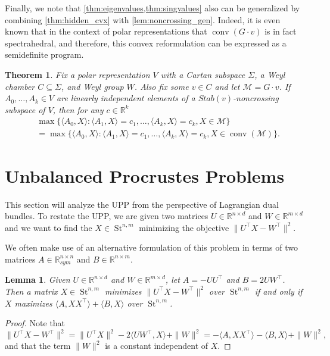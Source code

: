 \documentclass{article}
\numberwithin{equation}{section}
\newcommand{\R}{\mathbb{R}}
\DeclareMathOperator*{\conv}{conv}
\newtheorem{theorem}{Theorem}[section]
\newtheorem{lemma}{Lemma}[section]
\newcommand{\cM}{{\mathcal{M}}}
\DeclareMathOperator{\St}{St}
\begin{document}
Finally, we note that \cref{thm:eigenvalues,thm:singvalues} also can be generalized by combining \cref{thm:hidden_cvx} with \cref{lem:noncrossing_gen}. Indeed, it is even known that in the context of polar representations that $\conv(G\cdot v)$ is in fact spectrahedral, and therefore, this convex reformulation can be expressed as a semidefinite program.

\begin{theorem}
Fix a polar representation $V$ with a Cartan subspace $\Sigma$, a Weyl chamber $C \subseteq \Sigma$, and Weyl group $W$. Also fix some $v \in C$ and let $\cM = G \cdot v$.
If $A_0, \dots, A_k \in V$ are linearly independent elements of a $Stab(v)$-noncrossing subspace of $V$, then for any $c \in \R^k$
\begin{align*}
    &\max \{\langle A_0, X\rangle : \langle A_1, X\rangle = c_1, \dots, \langle A_k, X\rangle = c_k, X \in \cM\}\\
    &=\max \{\langle A_0, X\rangle : \langle A_1, X\rangle = c_1, \dots, \langle A_k, X\rangle = c_k, X \in \conv(\cM)\}.
\end{align*}
\end{theorem}

\section{Unbalanced Procrustes Problems}\label{sec:UPP}
This section will analyze the UPP from the perspective of Lagrangian dual bundles.
To restate the UPP, we are given two matrices $U \in \R^{n \times d}$ and $W \in \R^{m \times d}$ and we want to find the $X \in \St^{n, m}$ minimizing the objective $\|U^{\intercal}X-W^{\intercal}\|^2.$

We often make use of an alternative formulation of this problem in terms of two matrices $A \in \R^{n \times n}_{sym}$ and $B \in \R^{n \times m}$.
\begin{lemma}
\label{lem:UPP_equivalent}
Given $U\in \mathbb{R}^{n\times d}$ and $W\in \mathbb{R}^{m\times d}$, 
let $A = -UU^{\intercal}$ and $B = 2UW^{\intercal}$.
%
Then a matrix $X \in \St^{n,m}$ minimizes $\|U^{\intercal}X-W^{\intercal}\|^2$ over $\St^{n,m}$ if and only if $X$ maximizes $\langle A, XX^{\intercal}\rangle + \langle B, X\rangle$ over $\St^{n,m}$.
\end{lemma}
\begin{proof}
    Note that 
    \[
        \|U^{\intercal}X-W^{\intercal}\|^2 = \|U^{\intercal}X\|^2 - 2 \langle UW^{\intercal}, X\rangle + \|W\|^2  = - \langle A,XX^{\intercal}\rangle - \langle B, X\rangle + \|W\|^2,
    \]
    and that the term $\|W\|^2$ is a constant independent of $X$.
\end{proof}
\end{document}
